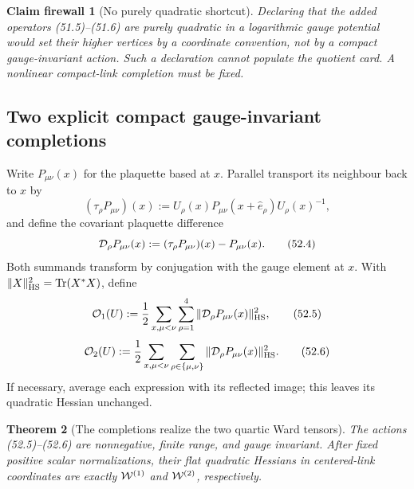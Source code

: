 \documentclass[11pt,oneside]{book}
\newtheorem{theorem}{Theorem}[chapter]
\newtheorem{firewall}[theorem]{Claim firewall}
\theoremstyle{definition}
\theoremstyle{remark}
\newcommand{\Tr}{\operatorname{Tr}}
\begin{document}
\begin{firewall}[No purely quadratic shortcut]
\label{fire:e8v52-no-quadratic-shortcut}
Declaring that the added operators (51.5)--(51.6) are purely
quadratic in a logarithmic gauge potential would set their higher
vertices by a coordinate convention, not by a compact
gauge-invariant action.  Such a declaration cannot populate the
quotient card.  A nonlinear compact-link completion must be fixed.
\end{firewall}

\subsection{Two explicit compact gauge-invariant completions}

Write \(P_{\mu\nu}(x)\) for the plaquette based at \(x\).  Parallel
transport its neighbour back to \(x\) by
\[
 (\tau_\rho P_{\mu\nu})(x)
 :=U_\rho(x)P_{\mu\nu}(x+\widehat e_\rho)U_\rho(x)^{-1},       \tag{52.3}
\]
and define the covariant plaquette difference
\[
 {\cal D}_\rho P_{\mu\nu}(x)
 :=(\tau_\rho P_{\mu\nu})(x)-P_{\mu\nu}(x).                   \tag{52.4}
\]
Both summands transform by conjugation with the gauge element at
\(x\).  With \(\|X\|_{\rm HS}^2=\Tr(X^*X)\), define
\[
 {\cal O}_1(U)
 :=\frac12\sum_{x,\mu<\nu}\sum_{\rho=1}^4
 \|{\cal D}_\rho P_{\mu\nu}(x)\|_{\rm HS}^2,                  \tag{52.5}
\]
\[
 {\cal O}_2(U)
 :=\frac12\sum_{x,\mu<\nu}
 \sum_{\rho\in\{\mu,\nu\}}
 \|{\cal D}_\rho P_{\mu\nu}(x)\|_{\rm HS}^2.                  \tag{52.6}
\]
If necessary, average each expression with its reflected image;
this leaves its quadratic Hessian unchanged.

\begin{theorem}[The completions realize the two quartic Ward
tensors]
\label{thm:e8v52-completions}
The actions (52.5)--(52.6) are nonnegative, finite range, and gauge
invariant.  After fixed positive scalar normalizations, their
flat quadratic Hessians in centered-link coordinates are exactly
\({\cal W}^{(1)}\) and \({\cal W}^{(2)}\), respectively.
\end{theorem}
\end{document}
